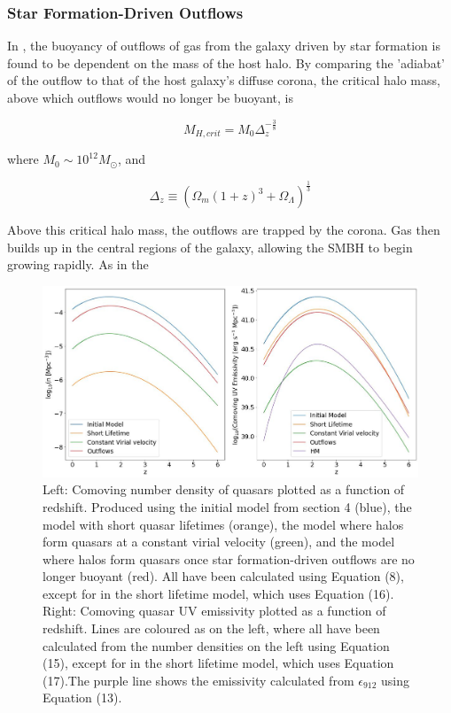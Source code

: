 \documentclass[12pt, twocolumn]{article}%
\begin{document}
\subsubsection{Star Formation-Driven Outflows}

In \cite{Quasar}, the buoyancy of outflows of gas from the galaxy driven by star formation is found to be dependent on the mass of the host halo. By comparing the 'adiabat' of the outflow to that of the host galaxy's diffuse corona, the critical halo mass, above which outflows would no longer be buoyant, is

\begin{equation}
    M_{H,crit}=M_0\Delta_z^{-\frac{3}{8}}
\end{equation}

\noindent where $M_0\sim10^{12}M_\odot$, and

\begin{equation}
    \Delta_z\equiv(\Omega_m(1+z)^3+\Omega_\Lambda)^{\frac{1}{3}}
\end{equation}

\noindent Above this critical halo mass, the outflows are trapped by the corona. Gas then builds up in the central regions of the galaxy, allowing the SMBH to begin growing rapidly. As in the

\onecolumngrid


\begin{figure}[H]
\centering
\includegraphics[width=\linewidth]{Plot_10.jpeg}
\caption{Left: Comoving number density of quasars plotted as a function of redshift. Produced using the initial model from section 4 (blue), the model with short quasar lifetimes (orange), the model where halos form quasars at a constant virial velocity (green), and the model where halos form quasars once star formation-driven outflows are no longer buoyant (red). All have been calculated using Equation (8), except for in the short lifetime model, which uses Equation (16). Right: Comoving quasar UV emissivity plotted as a function of redshift. Lines are coloured as on the left, where all have been calculated from the number densities on the left using Equation (15), except for in the short lifetime model, which uses Equation (17).The purple line shows the emissivity calculated from $\epsilon_{912}$ using Equation (13).}
\label{fig:10}
\end{figure}
\end{document}
